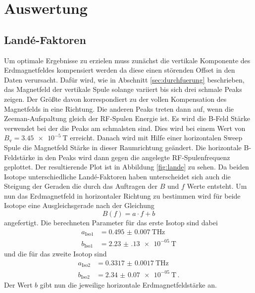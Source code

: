\newpage
\section{Auswertung}
\label{sec:auswertung}
\subsection{Landé-Faktoren}
Um optimale Ergebnisse zu erzielen muss zunächst die vertikale Komponente des Erdmagnetfeldes kompensiert werden da diese einen störenden Offset in den Daten verursacht.
Dafür wird, wie in Abschnitt \ref{sec:durchfuerung} beschrieben, das Magnetfeld der vertikale Spule solange variiert bis sich drei schmale Peaks zeigen.
Der Größte davon korrespondiert zu der vollen Kompensation des Magnetfelds in eine Richtung.
Die anderen Peaks treten dann auf, wenn die Zeeman-Aufspaltung gleich der RF-Spulen Energie ist.
Es wird die B-Feld Stärke verwendet bei der die Peaks am schmalsten sind.
Dies wird bei einem Wert von $B_\text{v} = \SI{3.45e-5}{\tesla}$ erreicht.
Danach wird mit Hilfe einer horizontalen Sweep Spule die Magnetfeld Stärke in dieser Raumrichtung geändert.
Die horizontale B-Feldstärke in den Peaks wird dann gegen die angelegte RF-Spulenfrequenz geplottet.
Der resultierende Plot ist in Abbildung \ref{fig:lande} zu sehen.
Da beiden Isotope unterschiedliche Landé-Faktoren haben unterscheidet sich auch die Steigung der Geraden die durch das Auftragen der $B$ und $f$ Werte entsteht.
Um nun das Erdmagnetfeld in horizontaler Richtung zu bestimmen wird für beide Isotope eine Ausgleichsgerade nach der Gleichung 
\begin{equation}
    B(f) = a\cdot f + b
\end{equation}
angefertigt.
Die berechneten Parameter für das erste Isotop sind dabei 
\begin{align*}
    a_\text{Iso1} & = \SI{0.495(7)}{\tesla\Hz} \\
    b_\text{Iso1} & = \SI{2.23(13)e-05}{\tesla}
\end{align*}
und die für das zweite Isotop sind
\begin{align*}
    a_\text{Iso2} &= \SI{0.3317(17)}{\tesla\Hz}\\ 
    b_\text{Iso2} &= \SI{2.34(7)e-05}{\tesla} \, .
\end{align*}
Der Wert $b$ gibt nun die jeweilige horizontale Erdmagnetfeldstärke an.
